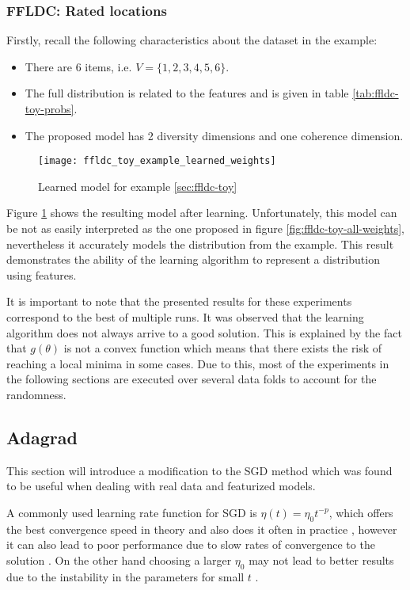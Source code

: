 \subsubsection{FFLDC: Rated locations}

Firstly, recall the following characteristics about the dataset in the example:

\begin{itemize}
  \item There are 6 items, i.e. $V = \{1,2,3,4,5,6\}$.
  \item The full distribution is related to the features and is given in table \ref{tab:ffldc-toy-probs}.
  \item The proposed model has 2 diversity dimensions and one coherence dimension.
\end{itemize}

\begin{figure}
  \centering
  \texttt{[image: ffldc\_toy\_example\_learned\_weights]}
  \caption{Learned model for example \ref{sec:ffldc-toy}}
  \label{fig:ffldc-toy-learned-weights}
\end{figure}

Figure \ref{fig:ffldc-toy-learned-weights} shows the resulting model after learning. Unfortunately, this model can be not as easily interpreted as the one proposed in figure \ref{fig:ffldc-toy-all-weights}, nevertheless it accurately models the distribution from the example. This result demonstrates the ability of the learning algorithm to represent a distribution using features.

It is important to note that the presented results for these experiments correspond to the best of multiple runs. It was observed that the learning algorithm does not always arrive to a good solution. This is explained by the fact that $g(\theta)$ is not a convex function which means that there exists the risk of reaching a local minima in some cases. Due to this, most of the experiments in the following sections are executed over several data folds to account for the randomness.

\subsection{Adagrad}
\label{sec:adagrad}

This section will introduce a modification to the SGD method which was found to be useful when dealing with real data and featurized models.

A commonly used learning rate function for SGD is $\eta(t) = \eta_{0}t^{-p}$, which offers the best convergence speed in theory and also does it often in practice \citep{bottou2012stochastic}, however it can also lead to poor performance due to slow rates of convergence to the solution \citep{darken1992towards}. On the other hand choosing a larger $\eta_{0}$ may not lead to better results due to the instability in the parameters for small $t$ \citep{Darken1990}. 

